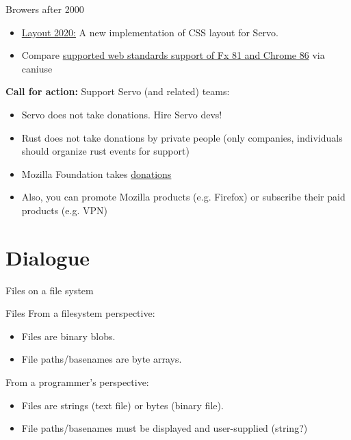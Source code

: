 \documentclass{beamer}
\begin{document}
\begin{frame}[fragile]{Browers after 2000}
  \begin{itemize}
    \item \href{https://github.com/servo/servo/wiki/Layout-2020}{Layout 2020:} A new implementation of CSS layout for Servo.
    \item Compare \href{https://caniuse.com/#compare=firefox+81,chrome+86}{supported web standards support of Fx 81 and Chrome 86} via caniuse
  \end{itemize}

  \textbf{Call for action:} Support Servo (and related) teams:
  \begin{itemize}
    \item Servo does not take donations. Hire Servo devs!
    \item Rust does not take donations by private people (only companies, individuals should organize rust events for support)
    \item Mozilla Foundation takes \href{https://donate.mozilla.org/en-US/}{donations}
    \item Also, you can promote Mozilla products (e.g. Firefox) or subscribe their paid products (e.g. VPN)
  \end{itemize}
\end{frame}


\section{Dialogue}

\begin{frame}[standout]
  Files on a file system
\end{frame}

\begin{frame}[fragile]{Files}
  From a filesystem perspective:
  \begin{itemize}
    \item Files are binary blobs.
    \item File paths/basenames are byte arrays.
  \end{itemize}
  From a programmer's perspective:
  \begin{itemize}
    \item Files are strings (text file) or bytes (binary file).
    \item File paths/basenames must be displayed and user-supplied (string?)
  \end{itemize}
\end{frame}
\end{document}
